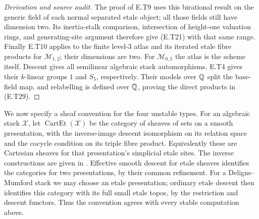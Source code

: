 \begin{proof}[Derivation and source audit]
The proof of E.T9 uses this birational result on the generic
field of each normal separated etale object; all those fields
still have dimension two.  Its inertia-stalk comparison,
intersection of height-one valuation rings, and generating-site
argument therefore give (E.T21) with that same range.  Finally
E.T10 applies to the finite level-$3$ atlas and its iterated
etale fibre products for $\mathcal M_{1,2}$; their dimensions
are two.  For $\mathcal M_{0,5}$ the atlas is the scheme itself.
Descent gives all semilinear algebraic stack automorphisms.
E.T4 gives their $k$-linear groups $1$ and $S_5$, respectively.
Their models over $\mathbb Q$ split the base-field map, and relabelling
is defined over $\mathbb Q$, proving the direct products in (E.T29).
\end{proof}

We now specify a sheaf convention for the four unstable types.
For an algebraic stack $\mathcal X$, let
$\operatorname{CartEt}(\mathcal X)$ be the category of sheaves
of sets on a smooth presentation, with the inverse-image
descent isomorphism on its relation space and the cocycle
condition on its triple fibre product.  Equivalently these are
Cartesian sheaves for that presentation's simplicial etale
sites.  The inverse constructions are given in
\cite[Lemma 85.12.4]{StacksCartesianDescent}.
Effective smooth descent for etale sheaves identifies the
categories for two presentations, by their common refinement.
For a Deligne--Mumford stack we may choose an etale presentation;
ordinary etale descent then identifies this category with its
full small etale topos, by the restriction and descent functors.
Thus the convention agrees with every stable computation above.

